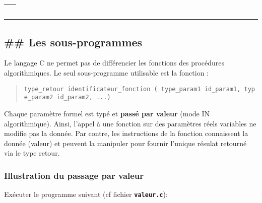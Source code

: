 \documentclass[11pt]{article}
\begin{document}
    \hypertarget{section}{%
\subsection{---}\label{section}}

\begin{center}\rule{0.5\linewidth}{0.5pt}\end{center}

    \hypertarget{les-sous-programmes}{%
\subsection{\#\# Les sous-programmes}\label{les-sous-programmes}}

    Le langage C ne permet pas de différencier les fonctions des procédures
algorithmiques. Le seul sous-programme utilisable est la fonction :

\begin{quote}
\texttt{type\_retour\ identificateur\_fonction\ (\ type\_param1\ id\_param1,\ type\_param2\ id\_param2,\ ...)}
\end{quote}

Chaque paramètre formel est typé et \textbf{passé par valeur} (mode IN
algorithmique). Ainsi, l'appel à une fonction sur des paramètres réels
variables ne modifie pas la donnée. Par contre, les instructions de la
fonction connaissent la donnée (valeur) et peuvent la manipuler pour
fournir l'unique résulat retourné via le type retour.

    \hypertarget{illustration-du-passage-par-valeur}{%
\subsubsection{Illustration du passage par
valeur}\label{illustration-du-passage-par-valeur}}

Exécuter le programme suivant (cf fichier \textbf{\texttt{valeur.c}}):
\end{document}
